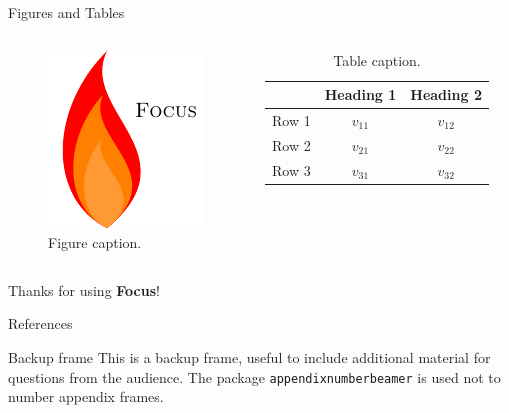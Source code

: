 \documentclass{beamer}
\begin{document}
    \begin{frame}{Figures and Tables}
        \begin{columns}
                \begin{figure}
                    \centering
                    \includegraphics{focus-logo.pdf}
                    \caption{Figure caption.}
                    \label{fig:focuslogo}
                \end{figure}
                
                \begin{table}
                    \centering
                    \begin{tabular}{rcc}
                         & Heading 1 & Heading 2 \\\hline
                        Row 1 & \(v_{11}\) & \(v_{12}\) \\
                        Row 2 & \(v_{21}\) & \(v_{22}\) \\
                        Row 3 & \(v_{31}\) & \(v_{32}\) \\
                    \end{tabular}
                    \caption{Table caption.}
                    \label{tab:demo}
                \end{table}
        \end{columns}
    \end{frame}
    
    \begin{frame}[focus]
        Thanks for using \textbf{Focus}!
    \end{frame}
    
    \appendix
    \begin{frame}{References}
        \nocite{*}
        
        
    \end{frame}
    
    \begin{frame}{Backup frame}
        This is a backup frame, useful to include additional material for questions from the audience.
        \vfill
        The package \texttt{appendixnumberbeamer} is used not to number appendix frames.
    \end{frame}
\end{document}
